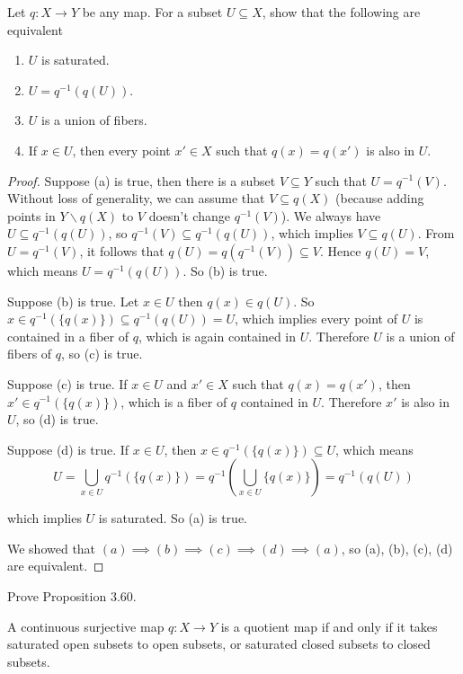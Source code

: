 \begin{exercise}{3.59}\label{exercise:3.59}
    Let $q: X\to Y$ be any map. For a subset $U\subseteq X$, show that the following are equivalent
    \begin{enumerate}[label={(\alph*)}]
        \item $U$ is saturated.
        \item $U = q^{-1}(q(U))$.
        \item $U$ is a union of fibers.
        \item If $x\in U$, then every point $x'\in X$ such that $q(x) = q(x')$ is also in $U$.
    \end{enumerate}
\end{exercise}

\begin{proof}
    Suppose (a) is true, then there is a subset $V\subseteq Y$ such that $U = q^{-1}(V)$. Without loss of generality, we can assume that $V\subseteq q(X)$ (because adding points in $Y\smallsetminus q(X)$ to $V$ doesn't change $q^{-1}(V)$). We always have $U\subseteq q^{-1}(q(U))$, so $q^{-1}(V)\subseteq q^{-1}(q(U))$, which implies $V\subseteq q(U)$. From $U = q^{-1}(V)$, it follows that $q(U) = q(q^{-1}(V))\subseteq V$. Hence $q(U) = V$, which means $U = q^{-1}(q(U))$. So (b) is true.

    Suppose (b) is true. Let $x\in U$ then $q(x)\in q(U)$. So $x\in q^{-1}(\{ q(x) \})\subseteq q^{-1}(q(U)) = U$, which implies every point of $U$ is contained in a fiber of $q$, which is again contained in $U$. Therefore $U$ is a union of fibers of $q$, so (c) is true.

    Suppose (c) is true. If $x\in U$ and $x'\in X$ such that $q(x) = q(x')$, then $x'\in q^{-1}(\{q(x)\})$, which is a fiber of $q$ contained in $U$. Therefore $x'$ is also in $U$, so (d) is true.

    Suppose (d) is true. If $x\in U$, then $x\in q^{-1}(\{ q(x) \})\subseteq U$, which means
    \[
        U = \bigcup_{x\in U}q^{-1}(\{ q(x) \}) = q^{-1}\left(\bigcup_{x\in U}\{ q(x) \}\right) = q^{-1}(q(U))
    \]

    which implies $U$ is saturated. So (a) is true.

    We showed that $(a)\implies (b) \implies (c) \implies (d) \implies (a)$, so (a), (b), (c), (d) are equivalent.
\end{proof}

\begin{exercise}{3.61}\label{exercise:3.61}
    Prove Proposition 3.60.

    A continuous surjective map $q: X\to Y$ is a quotient map if and only if it takes saturated open subsets to open subsets, or saturated closed subsets to closed subsets.
\end{exercise}

